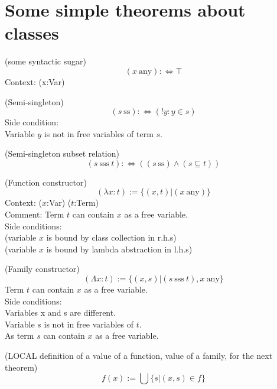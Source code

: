 \pagebreak

\section{Some simple theorems about classes}
\begin{definition}(some syntactic sugar)
\[
(x\ \mbox{any}) :\iff \top
\]
Context: (x:Var)
\end{definition}

\begin{definition}(Semi-singleton)
\[
(s\ \mbox{ss}) :\iff (!y:y\in s)
\]
Side condition:\\
Variable $y$ is not in free variables of term $s$.
\end{definition}

\begin{definition}(Semi-singleton subset relation)
\[
(s\ \mbox{sss}\ t) :\iff ((s\ \mbox{ss})\land(s\subseteq t))
\]
\end{definition}

\begin{definition}(Function constructor)
\[
(\lambda x: t) := \{(x,t)|(x\ \mbox{any})\}
\]
Context: ($x$:Var) ($t$:Term)\\
Comment: Term $t$ can contain $x$ as a free variable.\\
Side conditions:\\ 
(variable $x$ is bound by class collection in r.h.s)\\
(variable $x$ is bound by lambda abstraction in l.h.s)\\
\end{definition}

\begin{definition}(Family constructor)
\[
(\Lambda x: t) := \{(x,s)|(s\ \mbox{sss}\ t), x\ \mbox{any}\}
\]
Term $t$ can contain $x$ as a free variable.\\
Side conditions:\\
Variables x and s are different.\\ %
Variable $s$ is not in free variables of $t$.\\
As term $s$ can contain $x$ as a free variable.\\
\end{definition}

\begin{definition*}(LOCAL definition of a value of a function, value of a family, for the next theorem)
\[
f(x) := \bigcup \{s|(x,s)\in f\}
\]
\end{definition*}

